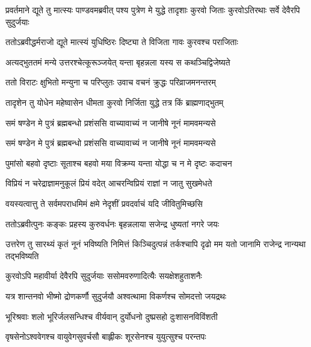 \onelineshloka
{प्रवर्तमाने द्यूते तु मात्स्यः पाण्डवमब्रवीत्}
\twolineshloka
{पश्य पुत्रेण मे युद्धे तादृशाः कुरवो जिताः}
{कुरवोऽतिरथाः सर्वे देवैरपि सुदुर्जयाः}


\twolineshloka
{ततोऽब्रवीद्धर्मराजो द्यूते मात्स्यं युधिष्ठिरः}
{दिष्ट्या ते विजिता गावः कुरवश्च पराजिताः}


\twolineshloka
{अत्यद्भुततमं मन्ये उत्तरश्चेत्कूरूञ्जयेत्}
{यन्ता बृहन्नला यस्य स कथञ्चिद्विजेष्यते}


\twolineshloka
{ततो विराटः क्षुभितो मन्युना च परिप्लुतः}
{उवाच वचनं क्रुद्धः परिव्राजमनन्तरम्}


\twolineshloka
{तादृशेन तु योधेन महेष्वासेन धीमता}
{कुरवो निर्जिता युद्धे तत्र किं ब्राह्मणाद्भुतम्}




\twolineshloka
{समं षण्डेन मे पुत्रं ब्रह्मबन्धो प्रशंससि}
{वाच्यावाच्यं न जानीषे नूनं मामवमन्यसे}




\twolineshloka
{समं षण्डेन मे पुत्रं ब्रह्मबन्धो प्रशंससि}
{वाच्यावाच्यं न जानीषे नूनं मामवमन्यसे}


\twolineshloka
{पुमांसो बहवो दृष्टाः सूताश्च बहवो मया}
{विक्रम्य यन्ता योद्धा च न मे दृष्टः कदाचन}


\twolineshloka
{विप्रियं न चरेद्राज्ञामनुकूलं प्रियं वदेत्}
{आचरन्विप्रियं राज्ञां न जातु सुखमेधते}


\twolineshloka
{वयस्यत्वात्तु ते सर्वमपराधमिमं क्षमे}
{नेदृशीं प्रवदर्वाचं यदि जीवितुमिच्छसि}



\twolineshloka
{ततोऽब्रवीत्पुनः कङ्कः प्रहस्य कुरुवर्धनः}
{बृहन्नलाया सजेन्द्र धुष्यतां नगरे जयः}


\threelineshloka
{उत्तरेण तु सारथ्यं कृतं नूनं भविष्यति}
{निमित्तं किञ्चिदुत्पन्नं तर्कश्चापि दृढो मम}
{यतो जानामि राजेन्द्र नान्यथा तद्भविष्यति}


\twolineshloka
{कुरवोऽपि महावीर्या देवैरपि सुदुर्जयाः}
{ससोमवरुणादित्यैः सयक्षेशहुताशनैः}


\twolineshloka
{यत्र शान्तनवो भीष्मो द्रोणकर्णौ सुदुर्जयौ}
{अश्वत्थामा विकर्णश्च सोमदत्तो जयद्रथः}


\twolineshloka
{भूरिश्रवाः शलो भूरिर्जलसन्धिश्च वीर्यवान्}
{दुर्योधनो दुष्प्रसहो दुःशासनविविंशती}


\twolineshloka
{वृषसेनोऽश्ववेगश्च वायुवेगसुवर्चसौ}
{बाह्लीकः शूरसेनश्च युयुत्सुश्च परन्तपः}


